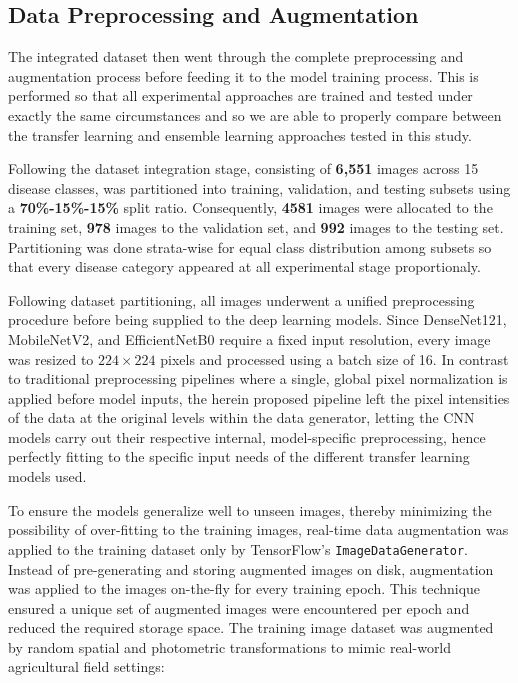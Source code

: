 
\subsection{Data Preprocessing and Augmentation}

The integrated dataset then went through the complete preprocessing and augmentation process before feeding it to the model training process. This is performed so that all experimental approaches are trained and tested under exactly the same circumstances and so we are able to properly compare between the transfer learning and ensemble learning approaches tested in this study.

Following the dataset integration stage, consisting of \textbf{6,551} images across 15 disease classes, was partitioned into training, validation, and testing subsets using a \textbf{70\%-15\%-15\%} split ratio. Consequently, \textbf{4581} images were allocated to the training set, \textbf{978} images to the validation set, and \textbf{992} images to the testing set. Partitioning was done strata-wise for equal class distribution among subsets so that every disease category appeared at all experimental stage proportionaly.

Following dataset partitioning, all images underwent a unified preprocessing procedure before being supplied to the deep learning models. Since DenseNet121, MobileNetV2, and EfficientNetB0 require a fixed input resolution, every image was resized to \textbf{$224 \times 224$} pixels and processed using a batch size of 16. In contrast to traditional preprocessing pipelines where a single, global pixel normalization is applied before model inputs, the herein proposed pipeline left the pixel intensities of the data at the original levels within the data generator, letting the CNN models carry out their respective internal, model-specific preprocessing, hence perfectly fitting to the specific input needs of the different transfer learning models used.

To ensure the models generalize well to unseen images, thereby minimizing the possibility of over-fitting to the training images, real-time data augmentation was applied to the training dataset only by TensorFlow’s \texttt{ImageDataGenerator}. Instead of pre-generating and storing augmented images on disk, augmentation was applied to the images on-the-fly for every training epoch. This technique ensured a unique set of augmented images were encountered per epoch and reduced the required storage space. The training image dataset was augmented by random spatial and photometric transformations to mimic real-world agricultural field settings:

